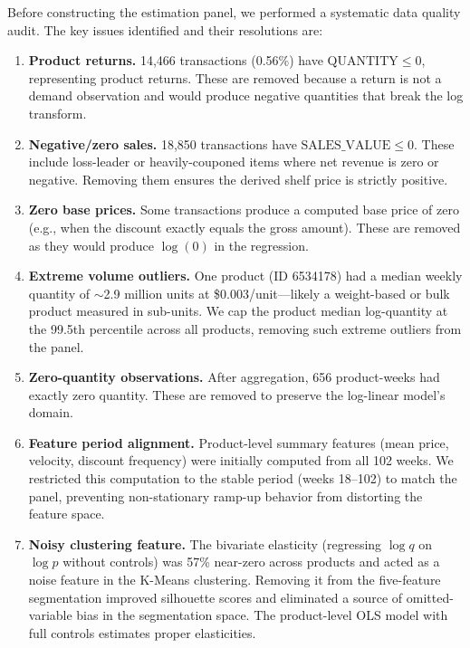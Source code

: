 \documentclass[12pt,a4paper]{article}
\begin{document}
Before constructing the estimation panel, we performed a systematic
data quality audit. The key issues identified and their resolutions
are:

\begin{enumerate}[nosep]
\item \textbf{Product returns.} 14,466 transactions (0.56\%) have
$\text{QUANTITY} \leq 0$, representing product returns. These are
removed because a return is not a demand observation and would
produce negative quantities that break the log transform.

\item \textbf{Negative/zero sales.} 18,850 transactions have
$\text{SALES\_VALUE} \leq 0$. These include loss-leader or
heavily-couponed items where net revenue is zero or negative.
Removing them ensures the derived shelf price is strictly positive.

\item \textbf{Zero base prices.} Some transactions produce a
computed base price of zero (e.g., when the discount exactly equals
the gross amount). These are removed as they would produce
$\log(0)$ in the regression.

\item \textbf{Extreme volume outliers.} One product (ID 6534178)
had a median weekly quantity of $\sim$2.9 million units at
\$0.003/unit---likely a weight-based or bulk product measured in
sub-units. We cap the product median log-quantity at the 99.5th
percentile across all products, removing such extreme outliers
from the panel.

\item \textbf{Zero-quantity observations.} After aggregation, 656
product-weeks had exactly zero quantity. These are removed to
preserve the log-linear model's domain.

\item \textbf{Feature period alignment.} Product-level summary
features (mean price, velocity, discount frequency) were initially
computed from all 102 weeks. We restricted this computation to the
stable period (weeks 18--102) to match the panel, preventing
non-stationary ramp-up behavior from distorting the feature space.

\item \textbf{Noisy clustering feature.} The bivariate elasticity
(regressing $\log q$ on $\log p$ without controls) was 57\%
near-zero across products and acted as a noise feature in the
K-Means clustering. Removing it from the five-feature segmentation
improved silhouette scores and eliminated a source of omitted-variable
bias in the segmentation space. The product-level OLS model with
full controls estimates proper elasticities.
\end{enumerate}
\end{document}
